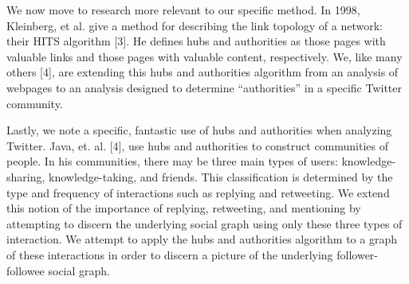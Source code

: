 \documentclass{sig-alternate-10pt}
\begin{document}
We now move to research more relevant to our specific method.
In 1998, Kleinberg, et al. give a method for describing the link topology of a network: their HITS algorithm [3].
He defines hubs and authorities as those pages with valuable links and those pages with valuable content, respectively.
We, like many others [4], are extending this hubs and authorities algorithm from an analysis of webpages to an analysis designed to determine ``authorities'' in a specific Twitter community.

Lastly, we note a specific, fantastic use of hubs and authorities when analyzing Twitter.
Java, et. al. [4], use hubs and authorities to construct communities of people.
In his communities, there may be three main types of users: knowledge-sharing, knowledge-taking, and friends.
This classification is determined by the type and frequency of interactions such as replying and retweeting.
We extend this notion of the importance of replying, retweeting, and mentioning by attempting to discern the underlying social graph using only these three types of interaction.
We attempt to apply the hubs and authorities algorithm to a graph of these interactions in order to discern a picture of the underlying follower-followee social graph.
\end{document}
